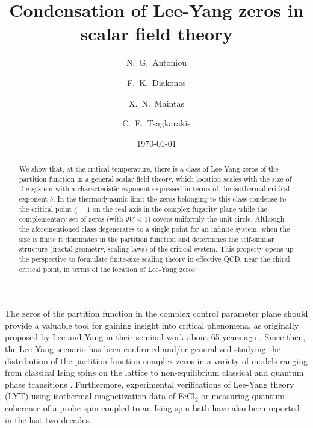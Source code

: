\documentclass[aps,pre,showpacs,amsmath,amssymb,superscriptaddress,twocolumn]{revtex4-1}
\begin{document}
\title{Condensation of Lee-Yang zeros in scalar field theory }


\author{N.~G.~Antoniou}

\author{F.~K.~Diakonos}

\author{X.~N.~Maintas}

\author{C.~E.~Tsagkarakis}

\date{\today}

\begin{abstract}
\noindent
We show that, at the critical temperature, there is a class of Lee-Yang zeros of the partition function in a general scalar field theory, which location scales with the size of the system with a characteristic exponent expressed in terms of the isothermal critical exponent $\delta$. In the thermodynamic limit the zeros belonging to this class condense to the critical point $\zeta=1$ on the real axis in the complex fugacity plane while the complementary set of zeros (with $\Re {\zeta} < 1$) covers uniformly the unit circle. Although the aforementioned class degenerates to a single point for an infinite system, when the size is finite it dominates in the partition function and determines the self-similar structure (fractal geometry, scaling laws) of the critical system. This property opens up the perspective to formulate finite-size scaling theory in effective QCD, near the chiral critical point, in terms of the location of Lee-Yang zeros. 
\end{abstract}

\pacs{} 

\maketitle

The zeros of the partition function in the complex control parameter plane should provide a valuable tool for gaining insight into critical phenomena, as originally proposed by Lee and Yang in their seminal work about 65 years ago \cite{Lee1952}. Since then, the Lee-Yang scenario has been confirmed and/or generalized studying the distribution of the partition function complex zeros in a variety of models ranging from classical Ising spins on the lattice to non-equilibrium classical and quantum phase transitions \cite{Byckling1965,Abe1967,Asano1968,Grossmann1968,Suzuki1970,Ruelle1971,Kortman1971,Newman1974,Fisher1978,Lieb1981,Yamada1981,Itzykson1983,Ozeki1988,Kenna1994,
Matveev1996,Creswick1997,Simon1997,Biskup2000,Blythe2003,Janke2004,Bena2005,Kim2006,Janke2006,Glumac2013,Hickey2013,Hickey2014}. Furthermore, experimental verifications of Lee-Yang theory (LYT) using isothermal magnetization data of FeCl$_2$ \cite{Binek1998,Binek2001} or measuring quantum coherence of a probe spin coupled to an Ising spin-bath  \cite{Peng2015} have also been reported in the last two decades.
\end{document}
